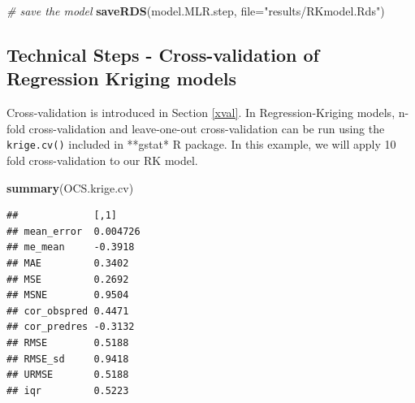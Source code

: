 \documentclass[10pt,b5paper,]{book}
\newenvironment{Shaded}{\begin{snugshade}}{\end{snugshade}}
\newcommand{\CommentTok}[1]{\textcolor[rgb]{0.56,0.35,0.01}{\textit{#1}}}
\newcommand{\DataTypeTok}[1]{\textcolor[rgb]{0.13,0.29,0.53}{#1}}
\newcommand{\DecValTok}[1]{\textcolor[rgb]{0.00,0.00,0.81}{#1}}
\newcommand{\KeywordTok}[1]{\textcolor[rgb]{0.13,0.29,0.53}{\textbf{#1}}}
\newcommand{\NormalTok}[1]{#1}
\newcommand{\OperatorTok}[1]{\textcolor[rgb]{0.81,0.36,0.00}{\textbf{#1}}}
\newcommand{\StringTok}[1]{\textcolor[rgb]{0.31,0.60,0.02}{#1}}
\theoremstyle{definition}
\theoremstyle{definition}
\theoremstyle{definition}
\theoremstyle{remark}
\begin{document}
\begin{Shaded}
\begin{Highlighting}[]
\CommentTok{# save the model}
\KeywordTok{saveRDS}\NormalTok{(model.MLR.step, }\DataTypeTok{file=}\StringTok{"results/RKmodel.Rds"}\NormalTok{)}
\end{Highlighting}
\end{Shaded}

\hypertarget{technical-steps---cross-validation-of-regression-kriging-models}{%
\subsection{Technical Steps - Cross-validation of Regression Kriging
models}\label{technical-steps---cross-validation-of-regression-kriging-models}}

Cross-validation is introduced in Section \ref{xval}. In
Regression-Kriging models, n-fold cross-validation and leave-one-out
cross-validation can be run using the \texttt{krige.cv()} included in
**gstat* R package. In this example, we will apply 10 fold
cross-validation to our RK model.

\begin{Shaded}
\end{Shaded}

\begin{Shaded}
\begin{Highlighting}[]
\KeywordTok{summary}\NormalTok{(OCS.krige.cv)}
\end{Highlighting}
\end{Shaded}

\begin{verbatim}
##             [,1]    
## mean_error  0.004726
## me_mean     -0.3918 
## MAE         0.3402  
## MSE         0.2692  
## MSNE        0.9504  
## cor_obspred 0.4471  
## cor_predres -0.3132 
## RMSE        0.5188  
## RMSE_sd     0.9418  
## URMSE       0.5188  
## iqr         0.5223
\end{verbatim}

\clearpage
\end{document}

